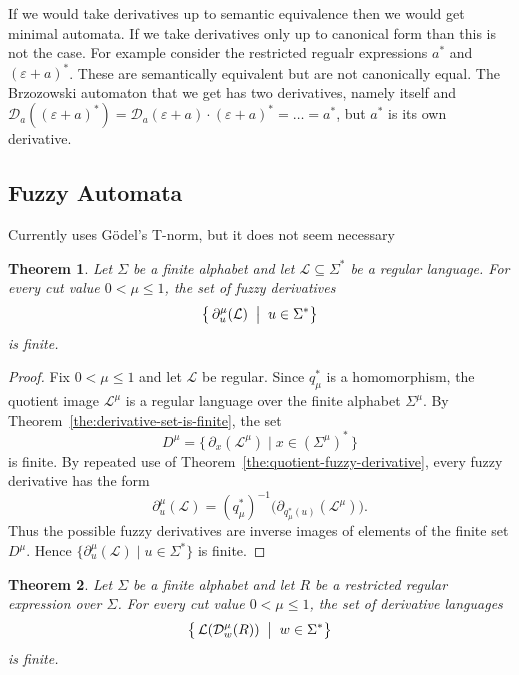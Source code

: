 \documentclass{article}
\def\cut{\mu}
\newtheorem{theorem}{Theorem}[section]
\begin{document}
 If we would take derivatives up to semantic equivalence then we would get minimal automata. If we take derivatives only up to canonical form than this is not the case. For example consider the restricted regualr expressions $a^\ast$ and $(\varepsilon+a)^\ast$. These are semantically equivalent but are not canonically equal.
The Brzozowski automaton that we get has two derivatives, namely itself and $\mathcal D_a((\varepsilon+a)^\ast) =\mathcal D_a(\varepsilon+a)\cdot(\varepsilon+a)^\ast=\ldots =a^\ast$, but $a^\ast$ is its own derivative. 



\subsection{Fuzzy Automata} {\color{red}Currently uses G\"odel's T-norm, but it does not seem necessary}
\begin{theorem}\label{the:fuzzy-derivative-set-finite}
Let $\Sigma$ be a finite alphabet and let $\mathcal{L} \subseteq \Sigma^*$ be a
regular language. For every cut value $0 < \cut \le 1$, the set of fuzzy
derivatives
\[
  \bigl\{\, \partial_u^\cut(\mathcal{L}) \;\bigm|\; u \in \Sigma^* \bigr\}
\]
is finite.
\end{theorem}

\begin{proof}
Fix $0 < \cut \le 1$ and let $\mathcal{L}$ be regular. Since $q_\cut^*$ is a
homomorphism, the quotient image $\mathcal L^\cut$ is a regular language over
the finite alphabet $\Sigma^\cut$. By Theorem~\ref{the:derivative-set-is-finite},
the set
\[
  D^\cut
  =
  \{\,\partial_x(\mathcal L^\cut) \mid x\in(\Sigma^\cut)^*\,\}
\]
is finite. By repeated use of Theorem~\ref{the:quotient-fuzzy-derivative},
every fuzzy derivative has the form
\[
  \partial_u^\cut(\mathcal L)
  =
  (q_\cut^*)^{-1}
  \bigl(\partial_{q_\cut^*(u)}(\mathcal L^\cut)\bigr).
\]
Thus the possible fuzzy derivatives are inverse images of elements of the finite
set $D^\cut$. Hence
$\{\partial_u^\cut(\mathcal{L}) \mid u \in \Sigma^*\}$ is finite.
\end{proof}



\begin{theorem}\label{the:regex-fuzzy-derivative-types-finite}
Let $\Sigma$ be a finite alphabet and let $R$ be a restricted regular expression over
$\Sigma$. For every cut value $0 < \cut \le 1$, the set of derivative languages
\[
  \bigl\{\, \mathcal{L}(\mathcal{D}^\cut_{w}(R)) \;\bigm|\; w \in \Sigma^* \bigr\}
\]
is finite.
\end{theorem}
\end{document}
